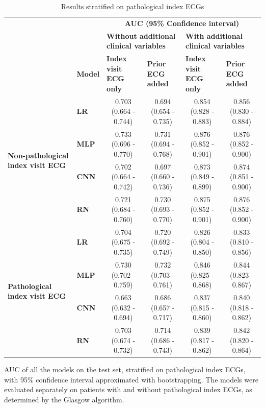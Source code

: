 \documentclass[preprint]{elsarticle}
\begin{document}
\renewcommand{\arraystretch}{1.2}
\begin{table}[H]
  \centering
  \scriptsize
\begin{adjustbox}{center}
\begin{tabular}{@{}llcccc@{}}
  \toprule
  & & \multicolumn{4}{c}{\textbf{AUC (95\% Confidence interval)}} \\
  \cmidrule(lr){3-6}
  & & \multicolumn{2}{l}{\textbf{Without additional clinical variables}} & \multicolumn{2}{l}{\textbf{With additional clinical variables}} \\
  \cmidrule(lr){3-4}\cmidrule(lr){5-6}
  & \multicolumn{1}{l}{\textbf{Model}} & \multicolumn{1}{l}{\textbf{Index visit ECG only}} & \multicolumn{1}{l}{\textbf{Prior ECG added}} & \multicolumn{1}{l}{\textbf{Index visit ECG only}} & \multicolumn{1}{l}{\textbf{Prior ECG added}} \\
  \midrule

\multirow{4}{*}{\begin{minipage}{0.65in}\textbf{Non-pathological index visit ECG}\end{minipage}} %
& \textbf{LR}  & 0.703 (0.664 - 0.744) & 0.694 (0.654 - 0.735) & 0.854 (0.828 - 0.883) & 0.856 (0.830 - 0.884) \\
& \textbf{MLP} & 0.733 (0.696 - 0.770) & 0.731 (0.694 - 0.768) & 0.876 (0.852 - 0.901) & 0.876 (0.852 - 0.900) \\
& \textbf{CNN} & 0.702 (0.664 - 0.742) & 0.697 (0.660 - 0.736) & 0.873 (0.849 - 0.899) & 0.874 (0.851 - 0.900) \\
& \textbf{RN}  & 0.721 (0.684 - 0.760) & 0.730 (0.693 - 0.770) & 0.875 (0.852 - 0.901) & 0.876 (0.852 - 0.900) \\
  \cmidrule(lr){1-2}
\multirow{4}{*}{\begin{minipage}{0.65in}\textbf{Pathological index visit ECG}\end{minipage}} %
& \textbf{LR}  & 0.704 (0.675 - 0.735) & 0.720 (0.692 - 0.749) & 0.826 (0.804 - 0.850) & 0.833 (0.810 - 0.856) \\
& \textbf{MLP} & 0.730 (0.702 - 0.759) & 0.732 (0.703 - 0.761) & 0.846 (0.825 - 0.868) & 0.844 (0.823 - 0.867) \\
& \textbf{CNN} & 0.663 (0.632 - 0.694) & 0.686 (0.657 - 0.717) & 0.837 (0.815 - 0.860) & 0.840 (0.818 - 0.862) \\
& \textbf{RN}  & 0.703 (0.674 - 0.732) & 0.714 (0.686 - 0.743) & 0.839 (0.817 - 0.862) & 0.842 (0.820 - 0.864) \\

\bottomrule
\end{tabular}
\end{adjustbox}
\caption{Results stratified on pathological index ECGs}
\medskip
\small
AUC of all the models on the test set, stratified on pathological index ECGs, with 95\% confidence interval approximated with bootstrapping. The models were evaluated separately on patients with and without pathological index ECGs, as determined by the Glasgow algorithm. 
\label{table:appendix:pathological}
\end{table}
\renewcommand{\arraystretch}{1}
\end{document}
